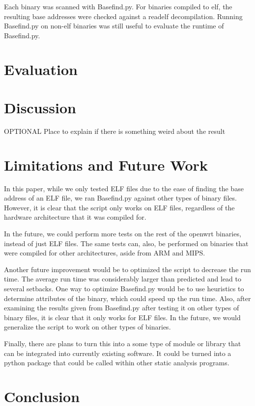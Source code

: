 \documentclass[letterpaper,twocolumn,10pt]{article}
\begin{document}
Each binary was scanned with Basefind.py. For binaries compiled to elf, the resulting base addresses were checked against a readelf decompilation. Running Basefind.py on non-elf binaries was still useful to evaluate the runtime of Basefind.py.

\section{Evaluation}

\section{Discussion}
OPTIONAL
Place to explain if there is something weird about the result

\section{Limitations and Future Work}
In this paper, while we only tested ELF files due to the ease of finding the base address of an ELF file, we ran Basefind.py against other types of binary files. However, it is clear that the script only works on ELF files, regardless of the hardware architecture that it was compiled for. 

In the future, we could perform more tests on the rest of the openwrt binaries, instead of just ELF files. The same tests can, also, be performed on binaries that were compiled for other architectures, aside from ARM and MIPS. 

Another future improvement would be to optimized the script to decrease the run time. The average run time was considerably larger than predicted and lead to several setbacks. One way to optimize Basefind.py would be to use heuristics to determine attributes of the binary, which could speed up the run time. Also, after examining the results given from Basefind.py after testing it on other types of binary files, it is clear that it only works for ELF files. In the future, we would generalize the script to work on other types of binaries. 

Finally, there are plans to turn this into a some type of module or library that can be integrated into currently existing software. It could be turned into a python package that could be called within other static analysis programs. 

\section{Conclusion}



\end{document}
